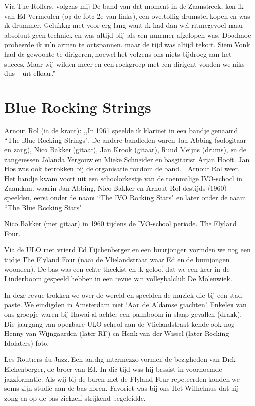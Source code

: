\documentclass[10pt,twoside,openright]{memoir}
\begin{document}
Via The Rollers, volgens mij De band van dat moment in de Zaanstreek, kon ik van Ed Vermeulen (op de foto 2e van links), een overtollig drumstel kopen en was ik drummer. Gelukkig niet voor erg lang want ik had dan wel ritmegevoel maar absoluut geen techniek en was altijd blij als een nummer afgelopen was. Doodmoe probeerde ik m'n armen te ontspannen, maar de tijd was altijd tekort. Siem Vonk had de gewoonte te dirigeren, hoewel het volgens ons niets bijdroeg aan het succes. Maar wij wilden meer en een rockgroep met een dirigent vonden we niks dus – uit elkaar.'' 

\chapter{Blue Rocking Strings} %
\label{cha:bluerocking}

Arnout Rol (in de krant): ,,In 1961 speelde ik klarinet in een bandje genaamd ``The Blue Rocking Strings". 
De andere bandleden waren Jan Abbing (sologitaar en zang), Nico Bakker (gitaar), Jan Krook (gitaar), Ruud Meijns (drums), en de zangeressen Jolanda Vergouw en Mieke Schneider en basgitarist Arjan Hooft. Jan Hos was ook betrokken bij de organisatie rondom de band. 
 
Arnout Rol weer. Het bandje kwam voort uit een schoolorkestje van de toenmalige IVO-school in Zaandam, waarin Jan Abbing, Nico Bakker en Arnout Rol destijds (1960) speelden, eerst onder de naam ``The IVO Rocking Stars" en later onder de naam ``The Blue Rocking Stars". 

Nico Bakker (met gitaar) in 1960 tijdens de IVO-school periode.
The Flyland Four.	

Via de ULO met vriend Ed Eijchenberger en een buurjongen vormden we nog een tijdje The Flyland Four (naar de Vlielandstraat waar Ed en de buurjongen woonden). De bas was een echte theekist en ik geloof dat we een keer in de Lindenboom gespeeld hebben in een revue van volleybalclub De Molenwiek. 

In deze revue trokken we over de wereld en speelden de muziek die bij een stad paste. We eindigden in Amsterdam met ‘Aan de A’damse grachten’. Enkelen van ons groepje waren bij Hawai al achter een palmboom in slaap gevallen (drank). Die jaargang van openbare ULO-school aan de Vlielandstraat kende ook nog Henny van Wijngaarden (later RF) en Henk van der Wissel (later Rocking Idolaters) foto.

Les Routiers du Jazz. Een aardig intermezzo vormen de bezigheden van Dick Eichenberger, de broer van Ed. In die tijd was hij bassist in voornoemde jazzformatie. Als wij bij de buren met de Flyland Four repeteerden konden we soms zijn studie aan de bas horen. Favoriet was bij ons Het Wilhelmus dat hij zong en op de bas zichzelf strijkend begeleidde. 
\end{document}
